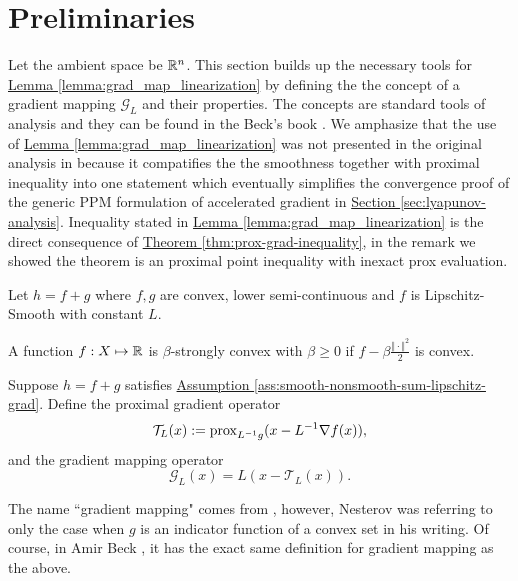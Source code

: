 \documentclass[12pt]{article}
\begin{document}
    
\section{Preliminaries}\label{sec:preliminaries}

    Let the ambient space be $\mathbb R^n$. 
    This section builds up the necessary tools for 
    \hyperref[lemma:grad_map_linearization]{Lemma \ref*{lemma:grad_map_linearization}}
    by defining the the concept of a gradient mapping $\mathcal G_L$ and their properties. 
    The concepts are standard tools of analysis and they can be found in the Beck's book \cite{beck_first-order_2017}. 
    We amphasize that the use of 
    \hyperref[lemma:grad_map_linearization]{Lemma \ref*{lemma:grad_map_linearization}}
    was not presented in the original analysis in \cite{ahn_understanding_2022} because it compatifies the the smoothness together with proximal inequality into one statement which eventually simplifies the convergence proof of the generic PPM formulation of accelerated gradient in
    \hyperref[sec:lyapunov-analysis]{Section \ref*{sec:lyapunov-analysis}}. 
    Inequality stated in \hyperref[lemma:grad_map_linearization]{Lemma \ref*{lemma:grad_map_linearization}} 
    is the direct consequence of
    \hyperref[thm:prox-grad-inequality]{Theorem \ref*{thm:prox-grad-inequality}}, 
    in the remark we showed the theorem is an proximal point inequality with inexact prox evaluation. 
    
    \begin{assumption}\label{ass:smooth-nonsmooth-sum-lipschitz-grad}
        Let $h = f + g$ where $f, g$ are convex, lower semi-continuous and $f$ is Lipschitz-Smooth with constant $L$. 
    \end{assumption}
    \begin{definition}
        A function $f: X \mapsto \mathbb R$ is $\beta$-strongly convex
        with $\beta\geq 0$ if $f - \beta \frac{\Vert \cdot\Vert^2}{2}$ is convex.
    \end{definition}

    \begin{definition}
        \label{def:gradient_mapping}
        Suppose $h = f + g$ satisfies 
        \hyperref[ass:smooth-nonsmooth-sum-lipschitz-grad]
        {Assumption \ref*{ass:smooth-nonsmooth-sum-lipschitz-grad}}. 
        Define the proximal gradient operator
        $$
            \mathcal T_L(x) := \operatorname{prox}_{L^{-1}g}(x - L^{-1}\nabla f(x)),
        $$
        and the gradient mapping operator
        $$
            \mathcal G_L(x) = L(x - \mathcal T_L(x)). 
        $$
    \end{definition}
    \begin{remark}
        The name ``gradient mapping" comes from \cite[(2.2.54)]{nesterov_lectures_2018}, however, Nesterov was referring to only the case when $g$ is an indicator function of a convex set in his writing. 
        Of course, in Amir Beck \cite[10.3.2]{beck_first-order_2017}, it has the exact same definition for gradient mapping as the above. 
    \end{remark}
\end{document}
